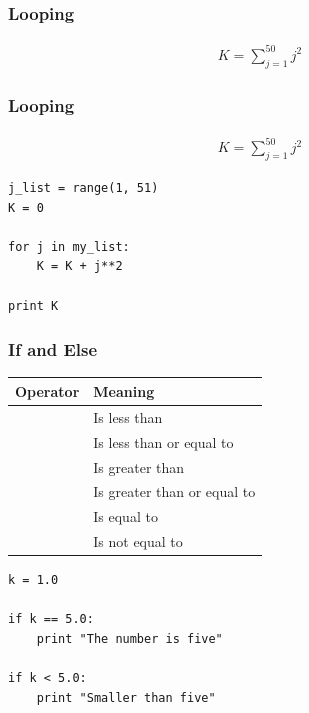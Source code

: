 \documentclass{beamer}
\begin{document}
\begin{frame}[fragile]

    \frametitle{Looping}

    \begin{align*}
        K = \sum_{j=1}^{50} j^2
    \end{align*}

    \bigskip
    \bigskip
\end{frame}

\begin{frame}[fragile]

    \frametitle{Looping}

    \begin{align*}
        K = \sum_{j=1}^{50} j^2
    \end{align*}

    \bigskip
    \bigskip

\begin{lstlisting}
j_list = range(1, 51)
K = 0

for j in my_list:
    K = K + j**2 

print K
\end{lstlisting}


\end{frame}


\begin{frame}[fragile]

    \frametitle{If and Else}

    \centering

    \begin{tabular}{l l}

        \bf Operator & \bf Meaning \\

        \midrule

        \code{<}  & Is less than \\
        \code{<=} & Is less than or equal to \\
        \code{>}  & Is greater than \\
        \code{>=} & Is greater than or equal to \\
        \code{==} & Is equal to \\
        \code{!=} & Is not equal to\\

    \end{tabular}

    \bigskip

\begin{lstlisting}
k = 1.0

if k == 5.0:
    print "The number is five"

if k < 5.0:
    print "Smaller than five"

\end{lstlisting}


\end{frame}
\end{document}
